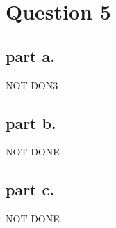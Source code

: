 \section{Question 5}

\subsection{part a.}
NOT DON3

\subsection{part b.}
NOT DONE

\subsection{part c.}
NOT DONE
